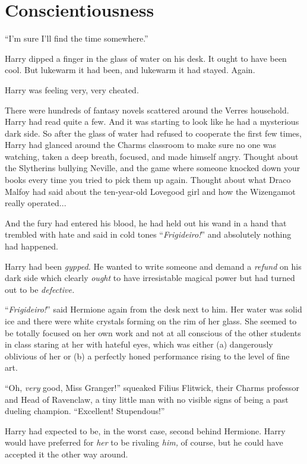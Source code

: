 
\chapter{Conscientiousness}

\epigraph{“I’m sure I’ll find the time somewhere.”}{}


\quad\quad Harry dipped a finger in the glass of water on his desk. It ought to have been cool. But lukewarm it had been, and lukewarm it had stayed. Again.

Harry was feeling very, very cheated.

There were hundreds of fantasy novels scattered around the Verres household. Harry had read quite a few. And it was starting to look like he had a mysterious dark side. So after the glass of water had refused to cooperate the first few times, Harry had glanced around the Charms classroom to make sure no one was watching, taken a deep breath, focused, and made himself angry. Thought about the Slytherins bullying Neville, and the game where someone knocked down your books every time you tried to pick them up again. Thought about what Draco Malfoy had said about the ten-year-old Lovegood girl and how the Wizengamot really operated...

And the fury had entered his blood, he had held out his wand in a hand that trembled with hate and said in cold tones “\emph{Frigideiro!}” and absolutely nothing had happened.

Harry had been \emph{gypped.} He wanted to write someone and demand a \emph{refund} on his dark side which clearly \emph{ought} to have irresistable magical power but had turned out to be \emph{defective.}

“\emph{Frigideiro!}” said Hermione again from the desk next to him. Her water was solid ice and there were white crystals forming on the rim of her glass. She seemed to be totally focused on her own work and not at all conscious of the other students in class staring at her with hateful eyes, which was either (a) dangerously oblivious of her or (b) a perfectly honed performance rising to the level of fine art.

“Oh, \emph{very} good, Miss Granger!” squeaked Filius Flitwick, their Charms professor and Head of Ravenclaw, a tiny little man with no visible signs of being a past dueling champion. “Excellent! Stupendous!”

Harry had expected to be, in the worst case, second behind Hermione. Harry would have preferred for \emph{her} to be rivaling \emph{him,} of course, but he could have accepted it the other way around.

